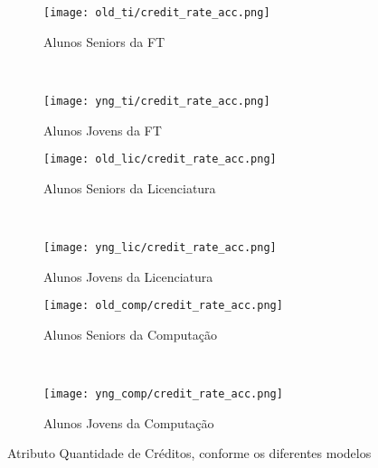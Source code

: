 \clearpage
\begin{figure}[!ht]
    \centering
    \begin{subfigure}[b]{0.48\textwidth}
        \centering
        \texttt{[image: old\_ti/credit\_rate\_acc.png]}
        \caption{Alunos Seniors da FT}
    \end{subfigure}
    ~
    \begin{subfigure}[b]{0.48\textwidth}
        \centering
        \texttt{[image: yng\_ti/credit\_rate\_acc.png]}
        \caption{Alunos Jovens da FT}
    \end{subfigure}

    \begin{subfigure}[b]{0.48\textwidth}
        \centering
        \texttt{[image: old\_lic/credit\_rate\_acc.png]}
        \caption{Alunos Seniors da Licenciatura}
    \end{subfigure}
    ~
    \begin{subfigure}[b]{0.48\textwidth}
        \centering
        \texttt{[image: yng\_lic/credit\_rate\_acc.png]}
        \caption{Alunos Jovens da Licenciatura}
    \end{subfigure}

    \begin{subfigure}[b]{0.48\textwidth}
        \centering
        \texttt{[image: old\_comp/credit\_rate\_acc.png]}
        \caption{Alunos Seniors da Computação}
    \end{subfigure}
    ~
    \begin{subfigure}[b]{0.48\textwidth}
        \centering
        \texttt{[image: yng\_comp/credit\_rate\_acc.png]}
        \caption{Alunos Jovens da Computação}
    \end{subfigure}
    \caption{Atributo Quantidade de Créditos, conforme os diferentes modelos}
\end{figure}

